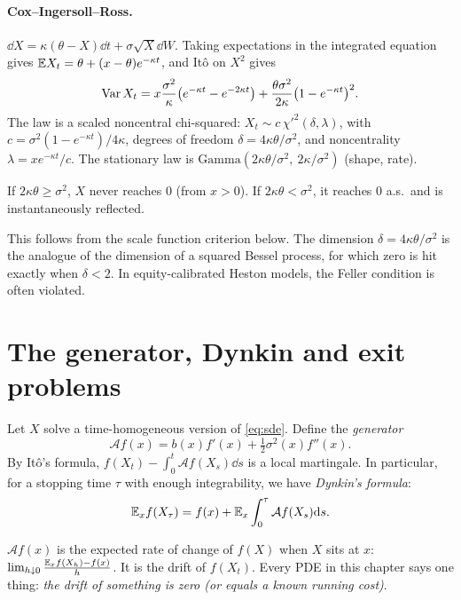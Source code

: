 \paragraph{Cox--Ingersoll--Ross.} $\dd X=\kappa(\theta-X)\dd t+\sigma\sqrt{X}\dd W$. Taking expectations in the integrated equation gives $\mathbb{E} X_t=\theta+(x-\theta)e^{-\kappa t}$, and It\^o on $X^2$ gives
\[
\operatorname{Var} X_t=x\frac{\sigma^2}{\kappa}\bigl(e^{-\kappa t}-e^{-2\kappa t}\bigr)+\frac{\theta\sigma^2}{2\kappa}\bigl(1-e^{-\kappa t}\bigr)^2.
\]
The law is a scaled noncentral chi-squared: $X_t\sim c\,\chi'^2(\delta,\lambda)$, with $c=\sigma^2(1-e^{-\kappa t})/4\kappa$, degrees of freedom $\delta=4\kappa\theta/\sigma^2$, and noncentrality $\lambda=xe^{-\kappa t}/c$. The stationary law is $\mathrm{Gamma}(2\kappa\theta/\sigma^2,\ 2\kappa/\sigma^2)$ (shape, rate).

\begin{proposition}\label{prop:feller}
If $2\kappa\theta\ge\sigma^2$, $X$ never reaches $0$ (from $x>0$). If $2\kappa\theta<\sigma^2$, it reaches $0$ a.s.\ and is instantaneously reflected.
\end{proposition}
This follows from the scale function criterion below. The dimension $\delta=4\kappa\theta/\sigma^2$ is the analogue of the dimension of a squared Bessel process, for which zero is hit exactly when $\delta<2$. In equity-calibrated Heston models, the Feller condition is often violated.

\section{The generator, Dynkin and exit problems}

Let $X$ solve a time-homogeneous version of \eqref{eq:sde}. Define the \emph{generator}
\[
\mathcal{A}f(x)=b(x)f'(x)+\tfrac12\sigma^2(x)f''(x).
\]
By It\^o's formula, $f(X_t)-\int_0^t\mathcal{A}f(X_s)\dd s$ is a local martingale. In particular, for a stopping time $\tau$ with enough integrability, we have \emph{Dynkin's formula}:
\[
\mathbb{E}_x f(X_\tau)=f(x)+\mathbb{E}_x\int_0^\tau\mathcal{A}f(X_s)\mathrm{d} s.
\]

\begin{intuition}
$\mathcal{A}f(x)$ is the expected rate of change of $f(X)$ when $X$ sits at $x$: $\lim_{h\downarrow0}\frac{\mathbb{E}_xf(X_h)-f(x)}{h}$. It is the drift of $f(X_t)$. Every PDE in this chapter says one thing: \emph{the drift of something is zero (or equals a known running cost)}.
\end{intuition}

